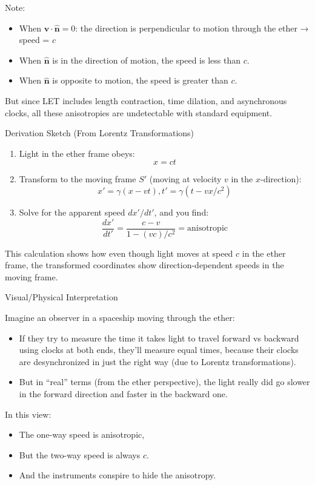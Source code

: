 \documentclass[a4paper]{article}
\theoremstyle{plain}
\theoremstyle{definition}
\newcommand{\vect}[1]{\mathbf{#1}}
\newcommand{\hatvec}[1]{\hat{\mathbf{#1}}}
\begin{document}
Note:
\begin{itemize}
\item When $\vect{v} \cdot \hatvec{n} = 0$: the direction is
  perpendicular to motion through the ether → speed = $c$
\item When $\hatvec{n}$ is in the direction of motion, the speed is
  less than $c$.
\item When $\hatvec{n}$ is opposite to motion, the speed is greater
  than $c$.
\end{itemize}
But since LET includes length contraction, time dilation, and
asynchronous clocks, all these anisotropies are undetectable with
standard equipment.

Derivation Sketch (From Lorentz Transformations)

\begin{enumerate}

\item Light in the ether frame obeys:
\begin{equation}
x = ct
\end{equation}

\item Transform to the moving frame $S'$ (moving at velocity $v$ in
  the $x$-direction):
\begin{equation}
x' = \gamma(x-vt), t' = \gamma(t-vx/c^2)
\end{equation}

\item Solve for the apparent speed $dx'/dt'$, and you find:
\begin{equation}
\frac{dx'}{dt'} = \frac{c-v}{1-(vc)/c^2} = \text{anisotropic}
\end{equation}
\end{enumerate}
This calculation shows how even though light moves at speed $c$ in the
ether frame, the transformed coordinates show direction-dependent
speeds in the moving frame.

Visual/Physical Interpretation

Imagine an observer in a spaceship moving through the ether:
\begin{itemize}
\item If they try to measure the time it takes light to travel forward
  vs backward using clocks at both ends, they'll measure equal times,
  because their clocks are desynchronized in just the right way (due
  to Lorentz transformations).
\item But in ``real'' terms (from the ether perspective), the light
  really did go slower in the forward direction and faster in the
  backward one.
\end{itemize}
In this view:
\begin{itemize}
\item The one-way speed is anisotropic,
\item But the two-way speed is always $c$.
\item And the instruments conspire to hide the anisotropy.
\end{itemize}
\end{document}
